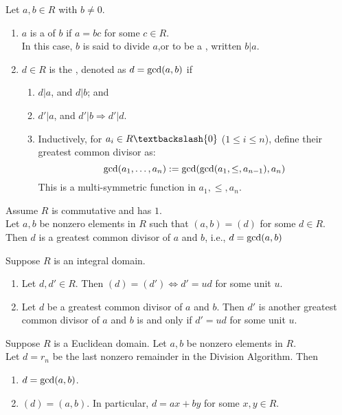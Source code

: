 \begin{definition}
Let $a, b \in R$ with $b \neq 0$.
\begin{enumerate}[label=(\roman*)]
\item $a$ is a  of $b$ if $a=bc$ for some $c \in R$.\\
In this case, $b$ is said to divide $a$,or to be a , written $b|a$.
\item $d \in R$ is the , denoted as $d = \textnormal{gcd}(a,b)$ if
\begin{enumerate}[label=\alph*.]
\item $d|a$, and $d|b$; and
\item $d'|a$, and $d'|b \Rightarrow d'|d$.
\item Inductively, for $a_i \in R \textbackslash \{0\}$ ($1\leq i \leq n$), define their greatest common divisor as:
\begin{equation}
\textnormal{gcd}(a_1, \ldots, a_n) := \textnormal{gcd}(\textnormal{gcd}(a_1, \leq, a_{n-1}), a_n) \nonumber
\end{equation}
This is a multi-symmetric function in $a_1, \leq, a_n$.
\end{enumerate}
\end{enumerate}
\end{definition}

\begin{proposition}
Assume $R$ is commutative and has $1$.\\
Let $a, b$ be nonzero elements in $R$ such that $(a, b) = (d)$ for some $d \in R$.\\
Then $d$ is a greatest common divisor of $a$ and $b$, i.e., $d = \textnormal{gcd}(a,b)$
\end{proposition}

\begin{proposition}
Suppose $R$ is an integral domain.
\begin{enumerate}[label=(\roman*)]
\item Let $d, d' \in R$. Then $(d) = (d') \Leftrightarrow d' = ud$ for some unit $u$.
\item Let $d$ be a greatest common divisor of $a$ and $b$. Then $d'$ is another greatest common divisor of $a$ and $b$ is and only if $d' = ud$ for some unit $u$.
\end{enumerate}
\end{proposition}

\begin{theorem}
Suppose $R$ is a Euclidean domain. Let $a, b$ be nonzero elements in $R$.\\
Let $d = r_n$ be the last nonzero remainder in the Division Algorithm. Then
\begin{enumerate}[label=(\roman*)]
\item $d=\textnormal{gcd}(a,b)$.
\item $(d) = (a,b)$. In particular, $d=ax + by$ for some $x,y \in R$.
\end{enumerate}
\end{theorem}

